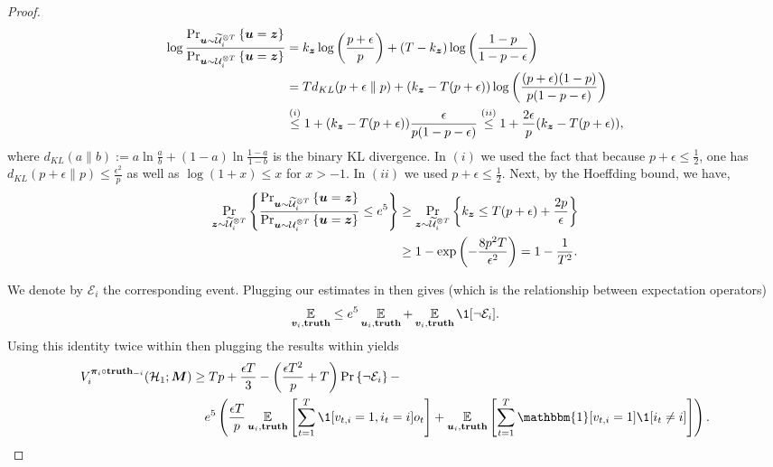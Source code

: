 \begin{proof}
     \begin{align*}
         \log \frac{\Pr_{\bm u\sim \widetilde{\mathcal U}_i^{\otimes T}} \left\{ \bm u = \bm z \right\} }{\Pr_{\bm u\sim {\mathcal U}_i^{\otimes T}} \left\{ \bm u = \bm z \right\} } &= k_{\bm z} \log\left( \frac{p+\epsilon}{p} \right) +(T-k_{\bm z})\log \left( \frac{1-p}{1-p-\epsilon} \right)\\
         &= T d_{KL}(p+\epsilon\parallel p) + (k_{\bm z}-T(p+\epsilon)) \log\left( \frac{(p+\epsilon)(1-p)}{p(1-p-\epsilon)} \right)\\
         &\overset{(i)}{\leq} 1 + (k_{\bm z}-T(p+\epsilon)) \frac{\epsilon}{p(1-p-\epsilon)} \overset{(ii)}{\leq} 1 + \frac{2\epsilon}{p}   (k_{\bm z}-T(p+\epsilon)),
     \end{align*}
     where $d_{KL}(a\parallel b):=a\ln\frac{a}{b} + (1-a)\ln\frac{1-a}{1-b}$ is the binary KL divergence. In $(i)$ we used the fact that because $p+\epsilon\leq \frac{1}{2}$, one has $d_{KL}(p+\epsilon \parallel p)\leq \frac{\epsilon^2}{p}$ \citep[Lemma 16]{blanchard2024tight} as well as $\log(1+x)\leq x$ for $x>-1$. In $(ii)$ we used $p+\epsilon\leq \frac{1}{2}$. Next, by the Hoeffding bound, we have,
     \begin{align}
        \Pr_{\bm z\sim \widetilde{\mathcal U}_i^{\otimes T}}\left\{  \frac{\Pr_{\bm u\sim \widetilde{\mathcal U}_i^{\otimes T}} \left\{ \bm u = \bm z \right\} }{\Pr_{\bm u\sim {\mathcal U}_i^{\otimes T}} \left\{ \bm u = \bm z \right\} } \leq e^{5} \right\} &\geq \Pr_{\bm z\sim \widetilde{\mathcal U}_i^{\otimes T}}\left\{  k_{\bm z} \leq T(p+\epsilon) + \frac{2p}{\epsilon}  \right\} \notag \\
        &\geq 1-\exp \left( -\frac{8 p^2 T}{\epsilon^2} \right) = 1-\frac{1}{T^2}.\label{eq:large_proba_similar_likelihood}
    \end{align}
    
    We denote by $\mathcal E_i$ the corresponding event. Plugging our estimates in  then gives (which is the relationship between expectation operators)
    \begin{equation}\label{eq:complete_comparison_expectations}
        \E_{\bm v_i,\textbf{truth}} \leq e^{5} \E_{\bm u_i,\textbf{truth}} + \E_{\bm v_i,\textbf{truth}}\1[\neg \mathcal E_i].
    \end{equation}
    Using this identity twice within  then plugging the results within  yields
    \begin{align*}
        V_i^{\bm\pi_i\circ \textbf{truth}_{-i}}(\mH_1;\bm M) &\geq Tp + \frac{\epsilon T}{3} -\paren{\frac{\epsilon T^2}{p}+T}\Pr\set{\neg \mathcal E_i}- \\
        &\quad e^{5} \paren{ \frac{\epsilon T}{p} \E_{\bm u_i,\textbf{truth}}\sqb{\sum_{t=1}^T \1[v_{t,i}=1,i_t=i]o_t} +  \E_{\bm u_i,\textbf{truth}} \sqb{\sum_{t=1}^T  \mathbbm{1}[v_{t,i}=1]\1[i_t\neq i] }}.
    \end{align*}
    

\end{proof}
